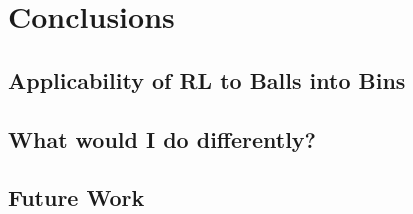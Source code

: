 
\chapter{Conclusions}\label{conclusion}

\ifpdf
    \graphicspath{{Chapter3/Figs/Raster/}{Chapter3/Figs/PDF/}{Chapter3/Figs/}}
\else
    \graphicspath{{Chapter3/Figs/Vector/}{Chapter3/Figs/}}
\fi




\section{Applicability of RL to Balls into Bins}

\section{What would I do differently?}


\section{Future Work}